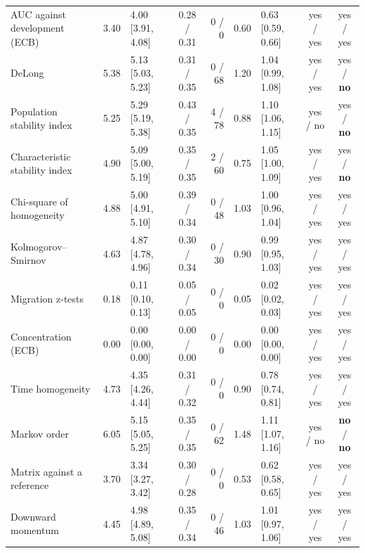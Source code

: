 {\begin{landscape}
\begin{table}[htbp]
{\begin{tabular}{lrlcrrlcc}
AUC against development (ECB) & 3.40 & 4.00 [3.91, 4.08] & 0.28 / 0.31 & 0 / 0 & 0.60 & 0.63 [0.59, 0.66] & yes / yes & yes / yes \\
DeLong & 5.38 & 5.13 [5.03, 5.23] & 0.31 / 0.35 & 0 / 68 & 1.20 & 1.04 [0.99, 1.08] & yes / yes & yes / \textbf{no} \\
Population stability index & 5.25 & 5.29 [5.19, 5.38] & 0.43 / 0.35 & 4 / 78 & 0.88 & 1.10 [1.06, 1.15] & yes / no & yes / \textbf{no} \\
Characteristic stability index & 4.90 & 5.09 [5.00, 5.19] & 0.35 / 0.35 & 2 / 60 & 0.75 & 1.05 [1.00, 1.09] & yes / yes & yes / \textbf{no} \\
Chi-square of homogeneity & 4.88 & 5.00 [4.91, 5.10] & 0.39 / 0.34 & 0 / 48 & 1.03 & 1.00 [0.96, 1.04] & yes / yes & yes / yes \\
Kolmogorov--Smirnov & 4.63 & 4.87 [4.78, 4.96] & 0.30 / 0.34 & 0 / 30 & 0.90 & 0.99 [0.95, 1.03] & yes / yes & yes / yes \\
Migration z-tests & 0.18 & 0.11 [0.10, 0.13] & 0.05 / 0.05 & 0 / 0 & 0.05 & 0.02 [0.02, 0.03] & yes / yes & yes / yes \\
Concentration (ECB) & 0.00 & 0.00 [0.00, 0.00] & 0.00 / 0.00 & 0 / 0 & 0.00 & 0.00 [0.00, 0.00] & yes / yes & yes / yes \\
Time homogeneity & 4.73 & 4.35 [4.26, 4.44] & 0.31 / 0.32 & 0 / 0 & 0.90 & 0.78 [0.74, 0.81] & yes / yes & yes / yes \\
Markov order & 6.05 & 5.15 [5.05, 5.25] & 0.35 / 0.35 & 0 / 62 & 1.48 & 1.11 [1.07, 1.16] & yes / no & \textbf{no} / \textbf{no} \\
Matrix against a reference & 3.70 & 3.34 [3.27, 3.42] & 0.30 / 0.28 & 0 / 0 & 0.53 & 0.62 [0.58, 0.65] & yes / yes & yes / yes \\
Downward momentum & 4.45 & 4.98 [4.89, 5.08] & 0.35 / 0.34 & 0 / 46 & 1.03 & 1.01 [0.97, 1.06] & yes / yes & yes / yes \\
\bottomrule
\end{tabular}}
\end{table}
\end{landscape}}

